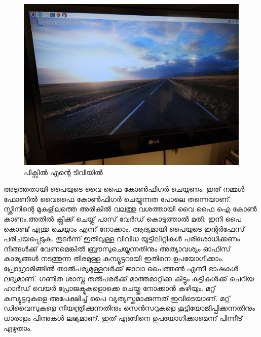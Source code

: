 \documentclass[10pt,a4paper]{report}
\begin{document}
 \begin{figure}[H]
  \center
\includegraphics[scale=.25]{images/pi4}

\caption{  പിക്സിൽ എന്റെ ടിവിയിൽ   }
\label{pi4}
\end{figure}
അടുത്തതായി പൈയുടെ വൈ ഫൈ കോൺഫിഗർ ചെയ്യണം. ഇത് നമ്മൾ ഫോണിൽ വൈഫൈ കോൺഫിഗർ ചെയ്യുന്നത പോലെ തന്നെയാണ്. സ്ക്രീനിന്റെ മുകളിലത്തെ അരികിൽ വലത്തു വശത്തായി വൈ ഫൈ ഐ കോൺ കാണം.അതിൽ ക്ലിക്ക് ചെയ്ത് പാസ് വേർഡ് കൊടുത്താൽ മതി.
ഇനി പൈ കൊണ്ട് എന്തു ചെയ്യാം എന്ന് നോക്കാം. ആദ്യമായി പൈയുടെ ഇന്റർഫേസ് പരിചയപ്പെടുക. തുടർന്ന് ഇതിലുള്ള വിവിധ യൂട്ടിലിറ്റികൾ പരിശോധിക്കണം നിങ്ങൾക്ക് വേണമെങ്കിൽ ബ്രൗസുചെയ്യുന്നതിനും അത്യാവശ്യം ഓഫിസ് കാര്യങ്ങൾ നടത്തുന്ന തിരമുള്ള കമ്പ്യൂട്ടറായി ഇതിനെ ഉപയോഗിക്കാം.
പ്രോഗ്രാമിങ്ങിൽ താൽപര്യമുള്ളവർക്ക് ജാവാ പൈത്തൺ എന്നീ ഭാഷകൾ ലഭ്യമാണ്. ഗണിത ശാസ്ത്ര തൽപരർക്ക് മാത്തമാറ്റിക്ക കിട്ടും 
കുട്ടികൾക്ക് ചെറിയ ഹാർഡ് വെയർ പ്രോജക്ടുകളൊക്കെ ചെയ്തു നോക്കാൻ കഴിയും. മറ്റ് കമ്പ്യൂട്ടറുകളെ അപേക്ഷിച്ച് പൈ വ്യത്യസ്തമാക്കുന്നത് ഇവിടെയാണ്. മറ്റ് ഡിവൈസുകളെ നിയന്ത്രിക്കുന്നതിനും സെൻസറുകളെ കൂട്ടിയോജിപ്പിക്കന്നതിനും ധാരാളം പിന്നുകൾ ലഭ്യമാണ്.
ഇത് എങ്ങിനെ ഉപയോഗിക്കാമെന്ന് പിന്നീട് എഴുതാം.
\end{document}
